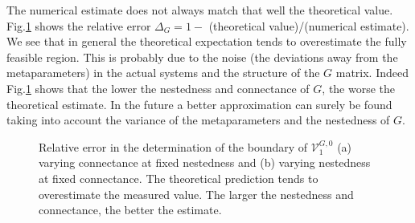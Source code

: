 \documentclass[12pt, titlepage]{report}
\begin{document}
The numerical estimate does not always match that well the theoretical value. Fig.\ref{fig : deviation away from theory feasibility} shows the relative error $\Delta_G = 1 -$ (theoretical value)/(numerical estimate). We see that in general the theoretical expectation tends to overestimate the fully feasible region. This is probably due to the noise (\ie the deviations away from the metaparameters) in the actual systems and the structure of the $G$ matrix. Indeed Fig.\ref{fig : deviation away from theory feasibility} shows that the lower the nestedness and connectance of $G$, the worse the theoretical estimate. In the future a better approximation can surely be found taking into account the variance of the metaparameters and the nestedness of $G$.
\begin{figure}[h!]
	\captionsetup[subfigure]{captionskip = -165pt, margin = 45pt}
\captionsetup[subfigure]{captionskip = -175pt, margin = 45pt}
\caption{Relative error in the determination of the boundary of $\mathcal{V}^{G,0}_1$ (a) varying connectance at fixed nestedness and (b) varying nestedness at fixed connectance. The theoretical prediction tends to overestimate the measured value. The larger the nestedness and connectance, the better the estimate.}\label{fig : deviation away from theory feasibility}
\end{figure}
\end{document}
